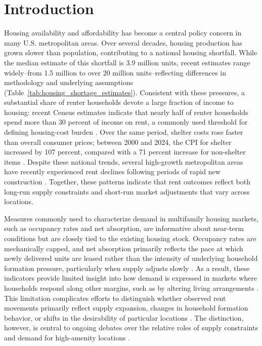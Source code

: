 \documentclass[pdflatex,sn-basic]{sn-jnl}%
\theoremstyle{thmstyleone}%
\theoremstyle{thmstyletwo}%
\theoremstyle{thmstylethree}%
\begin{document}

\maketitle


\section{Introduction}\label{sec1}
Housing availability and affordability has become a central policy concern in many U.S. metropolitan areas. Over several decades, housing production has grown slower than population, contributing to a national housing shortfall. While the median estimate of this shortfall is 3.9 million units, recent estimates range widely--from 1.5 million to over 20 million units--reflecting differences in methodology and underlying assumptions (Table~\ref{tab:housing_shortage_estimates}). Consistent with these pressures, a substantial share of renter households devote a large fraction of income to housing: recent Census estimates indicate that nearly half of renter households spend more than 30 percent of income on rent, a commonly used threshold for defining housing-cost burden \cite{censusNearlyHalf}. Over the same period, shelter costs rose faster than overall consumer prices; between 2000 and 2024, the CPI for shelter increased by 107 percent, compared with a 71 percent increase for non-shelter items \cite{stlouisfedConsumerPrice}. Despite these national trends, several high-growth metropolitan areas have recently experienced rent declines following periods of rapid new construction \cite{mott2024ThisRegion}. Together, these patterns indicate that rent outcomes reflect both long-run supply constraints and short-run market adjustments that vary across locations.

Measures commonly used to characterize demand in multifamily housing markets, such as occupancy rates and net absorption, are informative about near-term conditions but are closely tied to the existing housing stock. Occupancy rates are mechanically capped, and net absorption primarily reflects the pace at which newly delivered units are leased rather than the intensity of underlying household formation pressure, particularly when supply adjusts slowly \cite{mueller1999real}. As a result, these indicators provide limited insight into how demand is expressed in markets where households respond along other margins, such as by altering living arrangements \cite{gabriel2001rental, sirmans1991determinants, pyhrr1999real}. This limitation complicates efforts to distinguish whether observed rent movements primarily reflect supply expansion, changes in household formation behavior, or shifts in the desirability of particular locations \cite{pennington2021does, molloy2022housing}. The distinction, however, is central to ongoing debates over the relative roles of supply constraints \cite{saiz2010geographic} and demand for high-amenity locations \cite{davidoff2015supply}.
\end{document}

